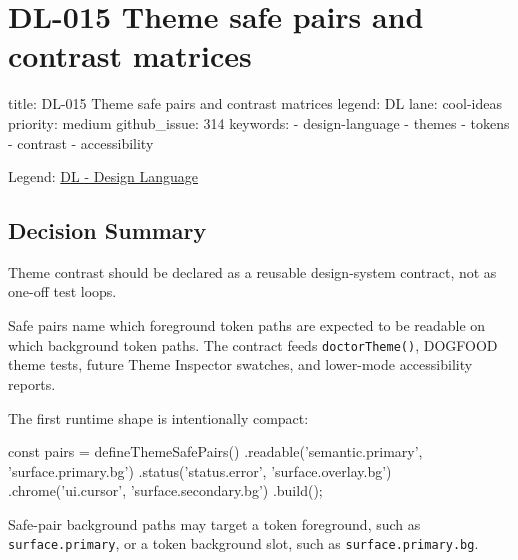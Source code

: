 \chapter{DL-015 Theme safe pairs and contrast matrices}\label{record-180}

\smallskip

\begin{RecordMeta}
title: DL-015 Theme safe pairs and contrast matrices
legend: DL
lane: cool-ideas
priority: medium
github_issue: 314
keywords:
  - design-language
  - themes
  - tokens
  - contrast
  - accessibility

\end{RecordMeta}

Legend: \href{https://github.com/flyingrobots/bijou/blob/1853ad902f6bf219326409e7f743a5a1d6517dbc/docs/legends/DL-design-language.md}{DL - Design Language}

\section{Decision Summary}\label{record-180-decision-summary}

Theme contrast should be declared as a reusable design-system contract, not as one-off test loops.

Safe pairs name which foreground token paths are expected to be readable on which background token paths. The contract feeds \texttt{d\allowbreak{}o\allowbreak{}c\allowbreak{}t\allowbreak{}o\allowbreak{}r\allowbreak{}T\allowbreak{}h\allowbreak{}e\allowbreak{}m\allowbreak{}e\allowbreak{}(\allowbreak{})}, DOGFOOD theme tests, future Theme Inspector swatches, and lower-mode accessibility reports.

The first runtime shape is intentionally compact:

\begin{CodeBlock}
const pairs = defineThemeSafePairs()
  .readable('semantic.primary', 'surface.primary.bg')
  .status('status.error', 'surface.overlay.bg')
  .chrome('ui.cursor', 'surface.secondary.bg')
  .build();
\end{CodeBlock}

Safe-pair background paths may target a token foreground, such as \texttt{s\allowbreak{}u\allowbreak{}r\allowbreak{}f\allowbreak{}a\allowbreak{}c\allowbreak{}e\allowbreak{}.\allowbreak{}p\allowbreak{}r\allowbreak{}i\allowbreak{}m\allowbreak{}a\allowbreak{}r\allowbreak{}y}, or a token background slot, such as \texttt{s\allowbreak{}u\allowbreak{}r\allowbreak{}f\allowbreak{}a\allowbreak{}c\allowbreak{}e\allowbreak{}.\allowbreak{}p\allowbreak{}r\allowbreak{}i\allowbreak{}m\allowbreak{}a\allowbreak{}r\allowbreak{}y\allowbreak{}.\allowbreak{}b\allowbreak{}g}.

